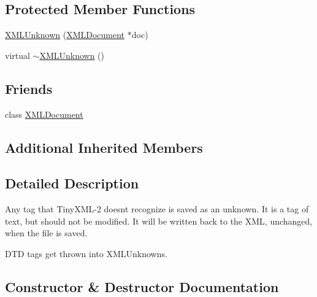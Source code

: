 \subsection*{Protected Member Functions}
\begin{DoxyCompactItemize}
\item 
\hyperlink{classtinyxml2_1_1_x_m_l_unknown_a9391eb679598d50baba424e6f1aa367b}{X\+M\+L\+Unknown} (\hyperlink{classtinyxml2_1_1_x_m_l_document}{X\+M\+L\+Document} $\ast$doc)
\item 
virtual \hyperlink{classtinyxml2_1_1_x_m_l_unknown_a86fcd722ca173a7f385bafafa879f26e}{$\sim$\+X\+M\+L\+Unknown} ()
\end{DoxyCompactItemize}
\subsection*{Friends}
\begin{DoxyCompactItemize}
\item 
class \hyperlink{classtinyxml2_1_1_x_m_l_unknown_a4eee3bda60c60a30e4e8cd4ea91c4c6e}{X\+M\+L\+Document}
\end{DoxyCompactItemize}
\subsection*{Additional Inherited Members}


\subsection{Detailed Description}
Any tag that Tiny\+X\+M\+L-\/2 doesn\textquotesingle{}t recognize is saved as an unknown. It is a tag of text, but should not be modified. It will be written back to the X\+M\+L, unchanged, when the file is saved.

D\+T\+D tags get thrown into X\+M\+L\+Unknowns. 

\subsection{Constructor \& Destructor Documentation}
\hypertarget{classtinyxml2_1_1_x_m_l_unknown_a9391eb679598d50baba424e6f1aa367b}{}
